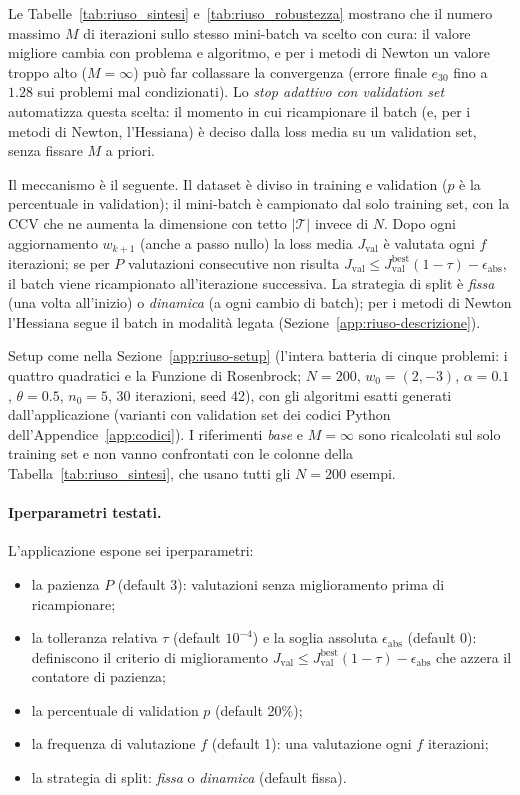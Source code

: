 \documentclass[a4paper,12pt]{article}
\numberwithin{equation}{section}
\numberwithin{figure}{section}
\numberwithin{table}{section}
\begin{document}
Le Tabelle~\ref{tab:riuso_sintesi} e~\ref{tab:riuso_robustezza} mostrano che
il numero massimo $M$ di iterazioni sullo stesso mini-batch va scelto con
cura: il valore migliore cambia con problema e algoritmo, e per i metodi di
Newton un valore troppo alto ($M=\infty$) può far collassare la convergenza
(errore finale $e_{30}$ fino a $1.28$ sui problemi mal condizionati). Lo
\emph{stop adattivo con validation set} automatizza questa scelta: il momento
in cui ricampionare il batch (e, per i metodi di Newton, l'Hessiana) è deciso
dalla loss media su un validation set, senza fissare $M$ a priori.

Il meccanismo è il seguente. Il dataset è diviso in training e validation
($p$ è la percentuale in validation); il mini-batch è campionato dal solo
training set, con la CCV che ne aumenta la dimensione con tetto
$\lvert\mathcal{T}\rvert$ invece di $N$. Dopo ogni aggiornamento $w_{k+1}$
(anche a passo nullo) la loss media $J_{\mathrm{val}}$ è valutata ogni $f$
iterazioni; se per $P$ valutazioni consecutive non risulta
$J_{\mathrm{val}} \le J_{\mathrm{val}}^{\mathrm{best}}(1-\tau)-\epsilon_{\mathrm{abs}}$,
il batch viene ricampionato all'iterazione successiva. La strategia di split
è \emph{fissa} (una volta all'inizio) o \emph{dinamica} (a ogni cambio di
batch); per i metodi di Newton l'Hessiana segue il batch in modalità legata
(Sezione~\ref{app:riuso-descrizione}).

Setup come nella Sezione~\ref{app:riuso-setup} (l'intera batteria di cinque
problemi: i quattro quadratici e la Funzione di Rosenbrock;
$N=200$, $w_0=(2,-3)$, $\alpha=0.1$, $\theta=0.5$, $n_0=5$, 30 iterazioni,
seed 42), con gli algoritmi esatti generati dall'applicazione (varianti con
validation set dei codici Python dell'Appendice~\ref{app:codici}). I
riferimenti \emph{base} e $M=\infty$ sono ricalcolati sul solo training set e
non vanno confrontati con le colonne della Tabella~\ref{tab:riuso_sintesi},
che usano tutti gli $N=200$ esempi.

\paragraph{Iperparametri testati.}
L'applicazione espone sei iperparametri:
\begin{itemize}
  \item la pazienza $P$ (default 3): valutazioni senza miglioramento prima di
  ricampionare;
  \item la tolleranza relativa $\tau$ (default $10^{-4}$) e la soglia assoluta
  $\epsilon_{\mathrm{abs}}$ (default 0): definiscono il criterio di
  miglioramento $J_{\mathrm{val}} \le J_{\mathrm{val}}^{\mathrm{best}}(1-\tau)-\epsilon_{\mathrm{abs}}$
  che azzera il contatore di pazienza;
  \item la percentuale di validation $p$ (default 20\%);
  \item la frequenza di valutazione $f$ (default 1): una valutazione ogni $f$
  iterazioni;
  \item la strategia di split: \emph{fissa} o \emph{dinamica} (default fissa).
\end{itemize}
\end{document}
